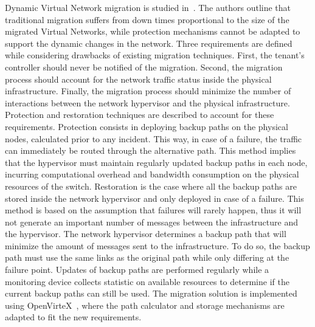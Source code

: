 Dynamic Virtual Network migration is studied in~\cite{Ko2017c}. The authors outline that traditional migration suffers from down times proportional to the size of the migrated Virtual Networks, while protection mechanisms cannot be adapted to support the dynamic changes in the network.
Three requirements are defined while considering drawbacks of existing migration techniques. 
First, the tenant's controller should never be notified of the migration.
Second, the migration process should account for the network traffic status inside the physical infrastructure.
Finally, the migration process should minimize the number of interactions between the network hypervisor and the physical infrastructure.
Protection and restoration techniques are described to account for these requirements.
Protection consists in deploying backup paths on the physical nodes, calculated prior to any incident.
This way, in case of a failure, the traffic can immediately be routed through the alternative path. 
This method implies that the hypervisor must maintain regularly updated backup paths in each node, incurring computational overhead and bandwidth consumption on the physical resources of the switch.
Restoration is the case where all the backup paths are stored inside the network hypervisor and only deployed in case of a failure.
This method is based on the assumption that failures will rarely happen, thus it will not generate an important number of messages between the infrastructure and the hypervisor.
The network hypervisor determines a backup path that will minimize the amount of messages sent to the infrastructure.
To do so, the backup path must use the same links as the original path while only differing at the failure point.
Updates of backup paths are performed regularly while a monitoring device collects statistic on available resources to determine if the current backup paths can still be used.
The migration solution is implemented using OpenVirteX~\cite{OpenVirteX-Al-Shabibi2014}, where the path calculator and storage mechanisms are adapted to fit the new requirements. 

